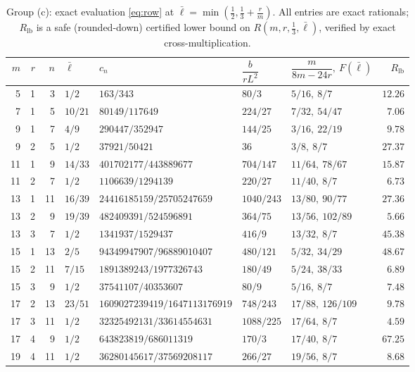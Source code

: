 \documentclass[11pt]{amsart}
\theoremstyle{remark}
\newcommand{\lbar}{\bar\ell}
\begin{document}
\begin{table}[ht]
\caption{Group (c): exact evaluation \eqref{eq:row} at $\lbar=\min(\tfrac12,\tfrac13+\tfrac rm)$.  All entries are exact rationals; $R_{\mathrm{lb}}$ is a safe (rounded-down) certified lower bound on $R(m,r,\tfrac13,\lbar)$, verified by exact cross-multiplication.}
\label{tab:pairs}
\centering
\footnotesize
\setlength{\tabcolsep}{4pt}
\begin{tabular}{@{}rrrllllr@{}}
\toprule
$m$ & $r$ & $n$ & $\lbar$ & $c_n$ & $\dfrac b{rL^2}$ & $\dfrac m{8m-24r},\ F(\lbar)$ & $R_{\mathrm{lb}}$\\
\midrule
 5&1& 3&$1/2$  &$163/343$                        &$80/3$   &$5/16,\ 8/7$    &$12.26$\\
 7&1& 5&$10/21$&$80149/117649$                   &$224/27$ &$7/32,\ 54/47$  &$7.06$\\
 9&1& 7&$4/9$  &$290447/352947$                  &$144/25$ &$3/16,\ 22/19$  &$9.78$\\
 9&2& 5&$1/2$  &$37921/50421$                    &$36$     &$3/8,\ 8/7$     &$27.37$\\
11&1& 9&$14/33$&$401702177/443889677$            &$704/147$&$11/64,\ 78/67$ &$15.87$\\
11&2& 7&$1/2$  &$1106639/1294139$                &$220/27$ &$11/40,\ 8/7$   &$6.73$\\
13&1&11&$16/39$&$24416185159/25705247659$        &$1040/243$&$13/80,\ 90/77$&$27.36$\\
13&2& 9&$19/39$&$482409391/524596891$            &$364/75$ &$13/56,\ 102/89$&$5.66$\\
13&3& 7&$1/2$  &$1341937/1529437$                &$416/9$  &$13/32,\ 8/7$   &$45.38$\\
15&1&13&$2/5$  &$94349947907/96889010407$        &$480/121$&$5/32,\ 34/29$  &$48.67$\\
15&2&11&$7/15$ &$1891389243/1977326743$          &$180/49$ &$5/24,\ 38/33$  &$6.89$\\
15&3& 9&$1/2$  &$37541107/40353607$              &$80/9$   &$5/16,\ 8/7$    &$7.48$\\
17&2&13&$23/51$&$1609027239419/1647113176919$    &$748/243$&$17/88,\ 126/109$&$9.78$\\
17&3&11&$1/2$  &$32325492131/33614554631$        &$1088/225$&$17/64,\ 8/7$  &$4.59$\\
17&4& 9&$1/2$  &$643823819/686011319$            &$170/3$  &$17/40,\ 8/7$   &$67.25$\\
19&4&11&$1/2$  &$36280145617/37569208117$        &$266/27$ &$19/56,\ 8/7$   &$8.68$\\

\end{tabular}
\end{table}
\end{document}

